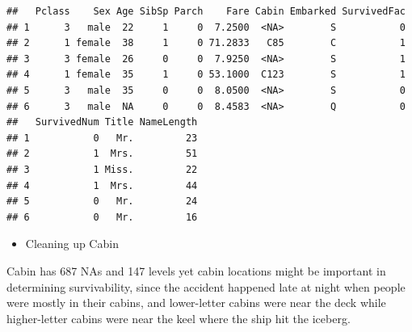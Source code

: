 \documentclass[]{article}
\providecommand{\tightlist}{%
  \setlength{\itemsep}{0pt}\setlength{\parskip}{0pt}}
\begin{document}
\begin{verbatim}
##   Pclass    Sex Age SibSp Parch    Fare Cabin Embarked SurvivedFac
## 1      3   male  22     1     0  7.2500  <NA>        S           0
## 2      1 female  38     1     0 71.2833   C85        C           1
## 3      3 female  26     0     0  7.9250  <NA>        S           1
## 4      1 female  35     1     0 53.1000  C123        S           1
## 5      3   male  35     0     0  8.0500  <NA>        S           0
## 6      3   male  NA     0     0  8.4583  <NA>        Q           0
##   SurvivedNum Title NameLength
## 1           0   Mr.         23
## 2           1  Mrs.         51
## 3           1 Miss.         22
## 4           1  Mrs.         44
## 5           0   Mr.         24
## 6           0   Mr.         16
\end{verbatim}

\begin{itemize}
\tightlist
\item
  Cleaning up Cabin
\end{itemize}

Cabin has 687 NAs and 147 levels yet cabin locations might be important
in determining survivability, since the accident happened late at night
when people were mostly in their cabins, and lower-letter cabins were
near the deck while higher-letter cabins were near the keel where the
ship hit the iceberg.
\end{document}
